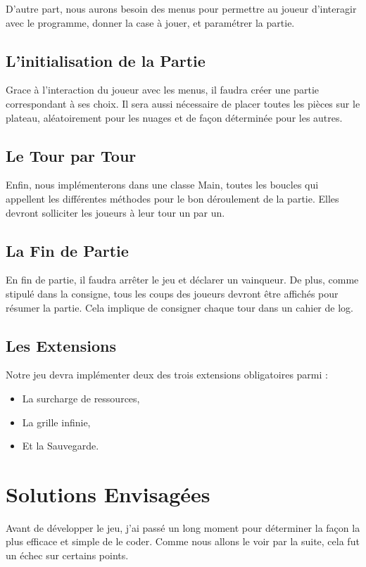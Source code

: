 \documentclass[titlepage]{report}
\begin{document}
D'autre part, nous aurons besoin des menus pour permettre au joueur d’interagir avec le programme, donner la case à jouer, et paramétrer la partie. 

\section{L’initialisation de la Partie}
Grace à l’interaction du joueur avec les menus, il faudra créer une partie correspondant à ses choix. Il sera aussi nécessaire de placer toutes les pièces sur le plateau, aléatoirement pour les nuages et de façon déterminée pour les autres. 

\section{Le Tour par Tour}
Enfin, nous implémenterons dans une classe Main, toutes les boucles qui appellent les différentes méthodes pour le bon déroulement de la partie. Elles devront solliciter les joueurs à leur tour un par un. 

\section{La Fin de Partie}
En fin de partie, il faudra arrêter le jeu et déclarer un vainqueur. De plus, comme stipulé dans la consigne, tous les coups des joueurs devront être affichés pour résumer la partie. Cela implique de consigner chaque tour dans un cahier de log. 

\section{Les Extensions}
Notre jeu devra implémenter deux des trois extensions obligatoires parmi : 

\begin{itemize}[label=$\bullet$]
    \setlength\itemsep{1em}
    \item La surcharge de ressources,
    \item La grille infinie,
    \item Et la Sauvegarde. 
\end{itemize}

\chapter{Solutions Envisagées}
Avant de développer le jeu, j’ai passé un long moment pour déterminer la façon la plus efficace et simple de le coder. Comme nous allons le voir par la suite, cela fut un échec sur certains points. 
\end{document}
